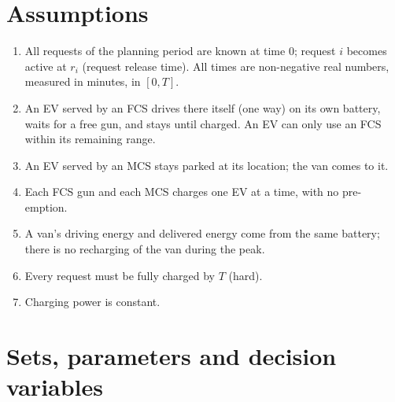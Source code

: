\documentclass[12pt,a4paper]{article}
\begin{document}
\section{Assumptions}
\begin{enumerate}[itemsep=2pt]
  \item All requests of the planning period are known at time 0; request $i$ becomes active at $r_i$ (request release time). All times are non-negative real numbers, measured in minutes, in $[0,T]$.
  \item An EV served by an FCS drives there itself (one way) on its own battery, waits for a free gun, and stays until charged. An EV can only use an FCS within its remaining range.
  \item An EV served by an MCS stays parked at its location; the van comes to it.
  \item Each FCS gun and each MCS charges one EV at a time, with no pre-emption.
  \item A van's driving energy and delivered energy come from the same battery; there is no recharging of the van during the peak.
  \item Every request must be fully charged by $T$ (hard).
  \item Charging power is constant.
\end{enumerate}

\newpage
\section{Sets, parameters and decision variables}
\end{document}
